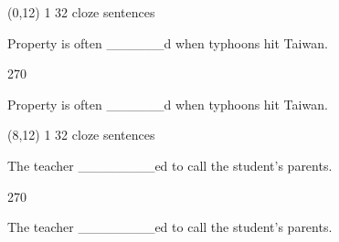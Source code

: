\documentclass[a4paper]{article}
\newenvironment{itemize*}%
{\begin{itemize}%
 \setlength{\itemsep}{0.5cm}%
 \setlength{\parsep}{0pt}%
 \setlength{\parskip}{0pt}}%
{\end{itemize}}
\newcommand{\mycard}[3]{%
	\small #1 #2
	\par
	\parbox[t][6.8cm][c]{9.5cm}{%
	\par
	\myleft{#3}
	\par
	\myright{#3}
	}
}
\newcommand{\myleft}[1]{%
	\begin{sideways}
	\hspace*{-0.9cm}
		\parbox[t][2.7cm][t]{6.5cm}{%
		\large #1
		}
	\end{sideways}
}
\newcommand{\myright}[1]{%
	\hspace*{6.5cm}
	\begin{turn}{270}
	\hspace*{-7.1cm}
		\parbox[t][2.7cm][t]{6.5cm}{%
		\large #1
		}
	\end{turn}
}
\begin{document}
\begin{textblock}{8}(0,12)
\mycard{1}{32 cloze sentences}{
\begin{itemize*}
\item Property is often \_\_\_\_\_\_d when typhoons hit Taiwan.
\end{itemize*}
}
\end{textblock}

\begin{textblock}{8}(8,12)
\mycard{1}{32 cloze sentences}{
\begin{itemize*}
\item The teacher \_\_\_\_\_\_\_\_ed to call the student's parents.
\end{itemize*}
}
\end{textblock}

\null
\newpage
\end{document}
